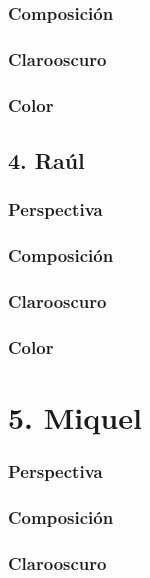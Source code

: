 \documentclass[12pt]{article}
\begin{document}
        \subsubsection{Composición}
    
        \subsubsection{Clarooscuro}
    
        \subsubsection{Color}
    \subsection{4. Raúl}
        \subsubsection{Perspectiva}
    
        \subsubsection{Composición}
    
        \subsubsection{Clarooscuro}
    
        \subsubsection{Color}
    \section{5. Miquel}
        \subsubsection{Perspectiva}
    
        \subsubsection{Composición}
    
        \subsubsection{Clarooscuro}
    
\end{document}
